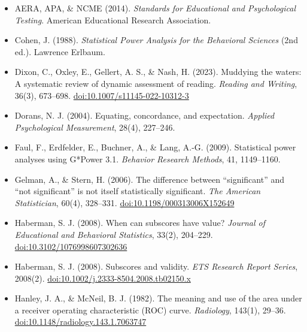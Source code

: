 \begin{itemize}[leftmargin=1.2em,itemsep=0.25em,label={}]

\item AERA, APA, \& NCME (2014). \textit{Standards for Educational and
Psychological Testing}. American Educational Research Association.

\item Cohen, J. (1988). \textit{Statistical Power Analysis for the Behavioral
Sciences} (2nd ed.). Lawrence Erlbaum.

\item Dixon, C., Oxley, E., Gellert, A. S., \& Nash, H. (2023). Muddying the
waters: A systematic review of dynamic assessment of reading.
\textit{Reading and Writing}, 36(3), 673--698.
\href{https://doi.org/10.1007/s11145-022-10312-3}{doi:10.1007/s11145-022-10312-3}

\item Dorans, N. J. (2004). Equating, concordance, and expectation.
\textit{Applied Psychological Measurement}, 28(4), 227--246.

\item Faul, F., Erdfelder, E., Buchner, A., \& Lang, A.-G. (2009). Statistical
power analyses using G*Power 3.1. \textit{Behavior Research Methods}, 41,
1149--1160.

\item Gelman, A., \& Stern, H. (2006). The difference between
``significant'' and ``not significant'' is not itself statistically
significant. \textit{The American Statistician}, 60(4), 328--331.
\href{https://doi.org/10.1198/000313006X152649}{doi:10.1198/000313006X152649}

\item Haberman, S. J. (2008). When can subscores have value?
\textit{Journal of Educational and Behavioral Statistics}, 33(2), 204--229.
\href{https://doi.org/10.3102/1076998607302636}{doi:10.3102/1076998607302636}

\item Haberman, S. J. (2008). Subscores and validity.
\textit{ETS Research Report Series}, 2008(2).
\href{https://doi.org/10.1002/j.2333-8504.2008.tb02150.x}{doi:10.1002/j.2333-8504.2008.tb02150.x}

\item Hanley, J. A., \& McNeil, B. J. (1982). The meaning and use of the
area under a receiver operating characteristic (ROC) curve.
\textit{Radiology}, 143(1), 29--36.
\href{https://doi.org/10.1148/radiology.143.1.7063747}{doi:10.1148/radiology.143.1.7063747}


\end{itemize}
